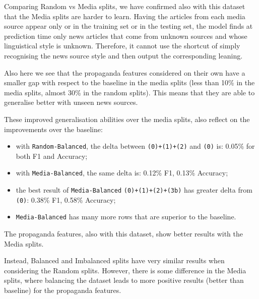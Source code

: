Comparing Random vs Media splits, we have confirmed also with this dataset that the Media splits are harder to learn. Having the articles from each media source appear only or in the training set or in the testing set, the model finds at prediction time only news articles that come from unknown sources and whose linguistical style is unknown. Therefore, it cannot use the shortcut of simply recognising the news source style and then output the corresponding leaning.

Also here we see that the propaganda features considered on their own have a smaller gap with respect to the baseline in the media splits (less than 10\% in the media splits, almost 30\% in the random splits).
This means that they are able to generalise better with unseen news sources.

These improved generalisation abilities over the media splits, also reflect on the improvements over the baseline:
\begin{itemize}
    \item with \texttt{Random-Balanced}, the delta between \texttt{(0)+(1)+(2)} and \texttt{(0)} is: 0.05\% for both F1 and Accuracy; %
    \item with \texttt{Media-Balanced}, the same delta is: 0.12\% F1, 0.13\% Accuracy; %
    \item the best result of \texttt{Media-Balanced} \texttt{(0)+(1)+(2)+(3b)} has greater delta from \texttt{(0)}: 0.38\% F1, 0.58\% Accuracy; %
    \item \texttt{Media-Balanced} has many more rows that are superior to the baseline.
\end{itemize}

The propaganda features, also with this dataset, show better results with the Media splits.

Instead, Balanced and Imbalanced splits have very similar results when considering the Random splits. However, there is some difference in the Media splits, where balancing the dataset leads to more positive results (better than baseline) for the propaganda features.

